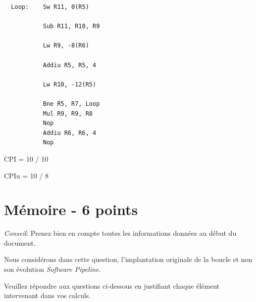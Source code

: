 \begin{correction}

  \begin{verbatim}
  Loop:    Sw R11, 0(R5)

           Sub R11, R10, R9

           Lw R9, -8(R6)

           Addiu R5, R5, 4

           Lw R10, -12(R5)

           Bne R5, R7, Loop
           Mul R9, R9, R8
           Nop
           Addiu R6, R6, 4
           Nop
  \end{verbatim}

  CPI = 10 / 10

  CPIu = 10 / 8

\end{correction}

%
%

\section{M\'emoire - 6 points}

\textit{Conseil}: Prenez bien en compte toutes les informations
donn\'ees au d\'ebut du document.

Nous consid\'erons dans cette question, l'implantation originale de la
boucle et non son \'evolution \textit{Software Pipeline}.

Veuillez r\'epondre aux questions ci-dessous en justifiant chaque \'el\'ement
intervenant dans vos calculs.

